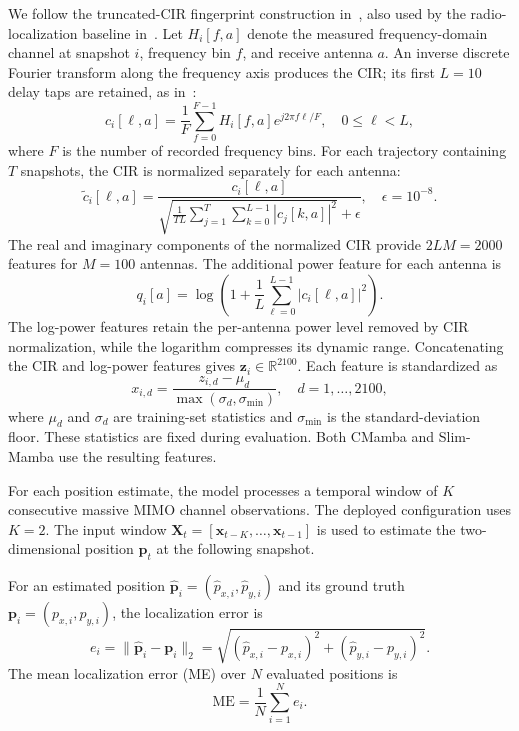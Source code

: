 \documentclass[lettersize,journal]{IEEEtran}
\begin{document}
We follow the truncated-CIR fingerprint construction in~\cite{Tian2024},
also used by the radio-localization baseline in~\cite{LuViRAValidation2024}.
Let $H_i[f,a]$ denote the measured frequency-domain channel at snapshot
$i$, frequency bin $f$, and receive antenna $a$. An inverse discrete
Fourier transform along the frequency axis produces the CIR; its first
$L=10$ delay taps are retained, as in~\cite{Tian2024}:
\begin{equation}
c_i[\ell,a]=\frac{1}{F}\sum_{f=0}^{F-1}H_i[f,a]
e^{j2\pi f\ell/F},\quad 0\leq\ell<L,
\label{eq:cir_features}
\end{equation}
where $F$ is the number of recorded frequency bins. For each trajectory
containing $T$ snapshots, the CIR is normalized separately for each antenna:
\begin{equation}
\tilde c_i[\ell,a]=\frac{c_i[\ell,a]}{\sqrt{\frac{1}{TL}
\sum_{j=1}^{T}\sum_{k=0}^{L-1}|c_j[k,a]|^2}+\epsilon},
\quad \epsilon=10^{-8}.
\label{eq:cir_normalization}
\end{equation}
The real and imaginary components of the normalized CIR
provide $2LM=2000$ features for $M=100$ antennas. The additional power
feature for each antenna is
\begin{equation}
q_i[a]=\log\!\left(1+\frac{1}{L}\sum_{\ell=0}^{L-1}
|c_i[\ell,a]|^2\right).
\label{eq:log_power_features}
\end{equation}
The log-power features retain the per-antenna power level removed by CIR
normalization, while the logarithm compresses its dynamic range. Concatenating
the CIR and log-power features gives $\mathbf{z}_i\in\mathbb{R}^{2100}$.
Each feature is standardized as
\begin{equation}
x_{i,d}=\frac{z_{i,d}-\mu_d}{\max(\sigma_d,\sigma_{\min})},
\quad d=1,\ldots,2100,
\label{eq:feature_standardization}
\end{equation}
where $\mu_d$ and $\sigma_d$ are training-set statistics and $\sigma_{\min}$
is the standard-deviation floor. These statistics are fixed during evaluation.
Both CMamba and Slim-Mamba use the resulting features.

For each position estimate, the model processes a temporal window of $K$
consecutive massive MIMO channel observations. The deployed configuration uses
\(K=2\). The input window
\(\mathbf{X}_t=[\mathbf{x}_{t-K},\ldots,\mathbf{x}_{t-1}]\)
is used to estimate the two-dimensional position $\mathbf{p}_t$ at the
following snapshot.

For an estimated position $\hat{\mathbf{p}}_i=(\hat p_{x,i},\hat p_{y,i})$
and its ground truth $\mathbf{p}_i=(p_{x,i},p_{y,i})$, the localization error is
\begin{equation}
e_i=\|\hat{\mathbf{p}}_i-\mathbf{p}_i\|_2
=\sqrt{(\hat p_{x,i}-p_{x,i})^2+(\hat p_{y,i}-p_{y,i})^2}.
\label{eq:localization_error}
\end{equation}
The mean localization error (ME) over $N$ evaluated positions is
\begin{equation}
\mathrm{ME}=\frac{1}{N}\sum_{i=1}^{N}e_i.
\label{eq:localization_me}
\end{equation}
\end{document}
